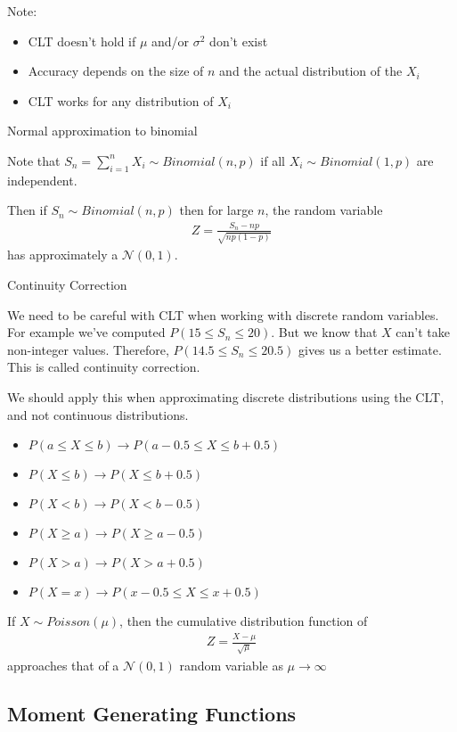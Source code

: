\documentclass{article}
\begin{document}
Note:
\begin{itemize}
    \item CLT doesn't hold if $\mu$ and/or $\sigma^2$ don't exist 
    \item Accuracy depends on the size of $n$ and the actual distribution of the $X_i$ 
    \item CLT works for any distribution of $X_i$
\end{itemize}

Normal approximation to binomial

Note that $S_n = \sum_{i=1}^n X_i \sim Binomial(n,p)$ if all $X_i \sim Binomial(1,p)$ are independent. 

Then if $S_n \sim Binomial(n,p)$ then for large $n$, the random variable
\begin{align*}
    Z = \frac{S_n - np}{\sqrt{np(1-p)}}
\end{align*}
has approximately a $\mathcal{N}(0,1)$.

Continuity Correction

We need to be careful with CLT when working with discrete random variables. For example we've computed $P(15 \le S_n \le 20)$. But we know that $X$ can't take non-integer values. Therefore, $P(14.5 \le S_n \le 20.5)$ gives us a better estimate. This is called continuity correction. 

We should apply this when approximating discrete distributions using the CLT, and not continuous distributions. 
\begin{itemize}
    \item $P(a \le X \le b) \to P(a - 0.5 \le X \le b + 0.5)$
    \item $P(X \le b) \to P(X \le b + 0.5)$
    \item $P(X < b) \to P(X < b - 0.5)$
    \item $P(X \ge a) \to P(X \ge a - 0.5)$
    \item $P(X > a) \to P(X > a + 0.5)$
    \item $P(X = x) \to P(x - 0.5 \le X \le x + 0.5)$
\end{itemize}

If $X \sim Poisson(\mu)$, then the cumulative distribution function of
\begin{align*}
    Z = \frac{X - \mu}{\sqrt{\mu}}
\end{align*}
approaches that of a $\mathcal{N}(0,1)$ random variable as $\mu \to \infty$


\subsection{Moment Generating Functions}
\end{document}
